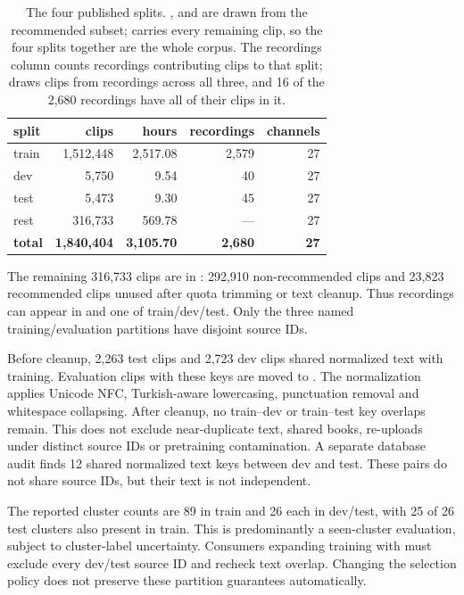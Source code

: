 \documentclass[11pt,a4paper]{article}
\begin{document}
\begin{table}[t]
\centering
\small
\begin{tabular}{lrrrr}
\toprule
split & clips & hours & recordings & channels \\
\midrule
train & 1,512,448 & 2,517.08 & 2,579 & 27 \\
dev & 5,750 & 9.54 & 40 & 27 \\
test & 5,473 & 9.30 & 45 & 27 \\
\midrule
rest & 316,733 & 569.78 & --- & 27 \\
\textbf{total} & \textbf{1,840,404} & \textbf{3,105.70} & \textbf{2,680} & \textbf{27} \\
\bottomrule
\end{tabular}
\caption{The four published splits. ,  and  are
drawn from the recommended subset;  carries every remaining clip, so
the four splits together are the whole corpus. The recordings column counts
recordings contributing clips to that split;  draws clips from recordings
across all three, and 16 of the 2,680 recordings have all of their clips in it.}
\label{tab:splits}
\end{table}

The remaining 316,733 clips are in : 292,910 non-recommended clips
and 23,823 recommended clips unused after quota trimming or text cleanup.
Thus recordings can appear in  and one of train/dev/test.
Only the three named training/evaluation partitions have disjoint source IDs.

Before cleanup, 2,263 test clips and 2,723 dev clips shared normalized text
with training. Evaluation clips with these keys are moved to .
The normalization applies Unicode NFC, Turkish-aware lowercasing, punctuation
removal and whitespace collapsing. After cleanup, no train--dev or train--test
key overlaps remain. This does not exclude near-duplicate text, shared books,
re-uploads under distinct source IDs or pretraining contamination. A separate database audit finds 12 shared normalized text keys between
dev and test. These pairs do not share source IDs, but their text is not
independent.

The reported cluster counts are 89 in train and 26 each in dev/test, with
25 of 26 test clusters also present in train. This is predominantly a
seen-cluster evaluation, subject to cluster-label uncertainty. Consumers
expanding training with  must exclude every dev/test source ID and
recheck text overlap. Changing the selection policy does not preserve these
partition guarantees automatically.
\end{document}
